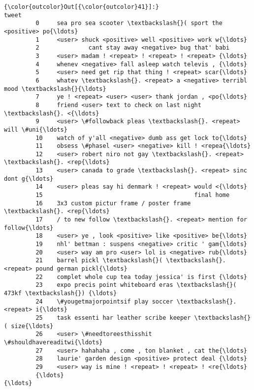 \documentclass[11pt]{article}
\begin{document}
\begin{Verbatim}[commandchars=\\\{\}]
{\color{outcolor}Out[{\color{outcolor}41}]:}                                                   tweet
         0     sea pro sea scooter \textbackslash{}( sport the <positive> po{\ldots}
         1     <user> shuck <positive> well <positive> work w{\ldots}
         2              cant stay away <negative> bug that' babi
         3     <user> madam ! <repeat> ! <repeat> ! <repeat> {\ldots}
         4     whenev <negative> fall asleep watch televis , {\ldots}
         5     <user> need get rip that thing ! <repeat> scar{\ldots}
         6     whatev \textbackslash{}. <repeat> a <negative> terribl mood \textbackslash{}{\ldots}
         7     ye ! <repeat> <user> <user> thank jordan , <po{\ldots}
         8     friend <user> text to check on last night \textbackslash{}. <{\ldots}
         9     <user> \#followback pleas \textbackslash{}. <repeat> will \#uni{\ldots}
         10    watch of y'all <negative> dumb ass get lock to{\ldots}
         11    obsess \#phasel <user> <negative> kill ! <repea{\ldots}
         12    <user> robert niro not gay \textbackslash{}. <repeat> \textbackslash{}. <rep{\ldots}
         13    <user> canada to grade \textbackslash{}. <repeat> sinc dont g{\ldots}
         14    <user> pleas say hi denmark ! <repeat> would <{\ldots}
         15                                           final home
         16    3x3 custom pictur frame / poster frame \textbackslash{}. <rep{\ldots}
         17    / to new follow \textbackslash{}. <repeat> mention for follow{\ldots}
         18    <user> ye , look <positive> like <positive> be{\ldots}
         19    nhl' bettman : suspens <negative> critic ' gam{\ldots}
         20    <user> way am pro <user> lol is <negative> rub{\ldots}
         21    barrel pickl \textbackslash{}( \textbackslash{}. <repeat> pound german pickl{\ldots}
         22    complet whole cup tea today jessica' is first {\ldots}
         23    expo precis point whiteboard eras \textbackslash{}( 473kf \textbackslash{}) {\ldots}
         24    \#yougetmajorpointsif play soccer \textbackslash{}. <repeat> i{\ldots}
         25    task essenti har leather scribe keeper \textbackslash{}( size{\ldots}
         26    <user> \#needtoreesthisshit \#shouldhavereaditwi{\ldots}
         27    <user> hahahaha , come , ton blanket , cat the{\ldots}
         28    laurie' garden design <positive> protect deal {\ldots}
         29    <user> way is mine ! <repeat> ! <repeat> ! <re{\ldots}
         {\ldots}                                                 {\ldots}

\end{Verbatim}
\end{document}
